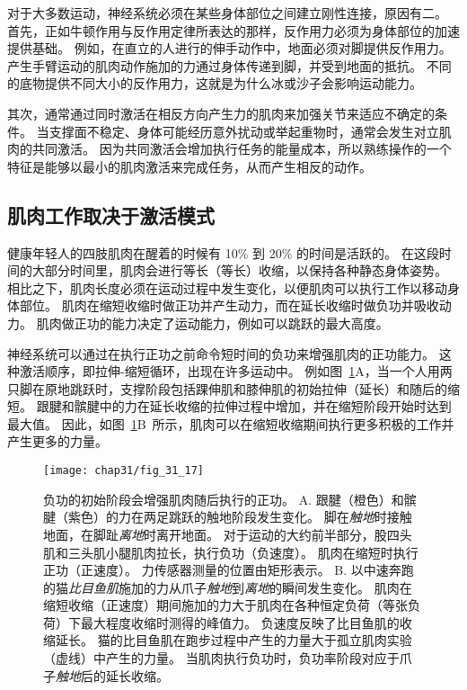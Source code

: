 对于大多数运动，神经系统必须在某些身体部位之间建立刚性连接，原因有二。
首先，正如牛顿作用与反作用定律所表达的那样，反作用力必须为身体部位的加速提供基础。
例如，在直立的人进行的伸手动作中，地面必须对脚提供反作用力。
产生手臂运动的肌肉动作施加的力通过身体传递到脚，并受到地面的抵抗。
不同的底物提供不同大小的反作用力，这就是为什么冰或沙子会影响运动能力。


其次，通常通过同时激活在相反方向产生力的肌肉来加强关节来适应不确定的条件。
当支撑面不稳定、身体可能经历意外扰动或举起重物时，通常会发生对立肌肉的共同激活。
因为共同激活会增加执行任务的能量成本，所以熟练操作的一个特征是能够以最小的肌肉激活来完成任务，从而产生相反的动作。



\subsection{肌肉工作取决于激活模式}

健康年轻人的四肢肌肉在醒着的时候有 10\% 到 20\% 的时间是活跃的。
在这段时间的大部分时间里，肌肉会进行等长（等长）收缩，以保持各种静态身体姿势。
相比之下，肌肉长度必须在运动过程中发生变化，以便肌肉可以执行工作以移动身体部位。
肌肉在缩短收缩时做正功并产生动力，而在延长收缩时做负功并吸收动力。
肌肉做正功的能力决定了运动能力，例如可以跳跃的最大高度。


神经系统可以通过在执行正功之前命令短时间的负功来增强肌肉的正功能力。
这种激活顺序，即拉伸-缩短循环，出现在许多运动中。 
例如图~\ref{fig:31_17}A，当一个人用两只脚在原地跳跃时，支撑阶段包括踝伸肌和膝伸肌的初始拉伸（延长）和随后的缩短。
跟腱和髌腱中的力在延长收缩的拉伸过程中增加，并在缩短阶段开始时达到最大值。
因此，如图~\ref{fig:31_17}B~所示，肌肉可以在缩短收缩期间执行更多积极的工作并产生更多的力量。


\begin{figure}[htbp]
	\centering
	\texttt{[image: chap31/fig\_31\_17]}
	\caption{负功的初始阶段会增强肌肉随后执行的正功\cite{finni2000vivo,gregor1988mechanical}。
	A. 跟腱（橙色）和髌腱（紫色）的力在两足跳跃的触地阶段发生变化。
	脚在\textit{触地}时接触地面，在脚趾\textit{离地}时离开地面。
	对于运动的大约前半部分，股四头肌和三头肌小腿肌肉拉长，执行负功（负速度）。
	肌肉在缩短时执行正功（正速度）。
	力传感器测量的位置由矩形表示。
	B. 以中速奔跑的猫\textit{比目鱼肌}施加的力从爪子\textit{触地}到\textit{离地}的瞬间发生变化。
	肌肉在缩短收缩（正速度）期间施加的力大于肌肉在各种恒定负荷（等张负荷）下最大程度收缩时测得的峰值力。
	负速度反映了比目鱼肌的收缩延长。
	猫的比目鱼肌在跑步过程中产生的力量大于孤立肌肉实验（虚线）中产生的力量。
	当肌肉执行负功时，负功率阶段对应于爪子\textit{触地}后的延长收缩。}
	\label{fig:31_17}
\end{figure}


